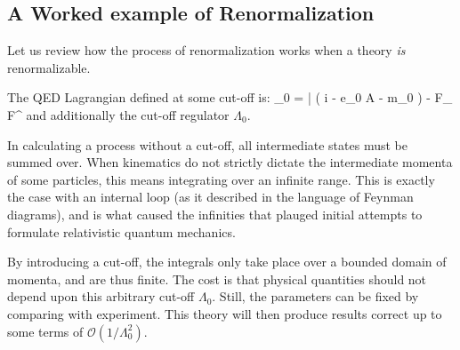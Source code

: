 


\subsection{A Worked example of Renormalization}
Let us review how the process of renormalization works when a theory {\it is} renormalizable.


The QED Lagrangian defined at some cut-off is:
\beq
	_0 = 
		\bar{\Psi} \left( i \partial \cdot \gamma - e_0 A \cdot \gamma - m_0 \right) \Psi -  F_{\mu\nu} F^{\mu\nu} 
\eeq 
and additionally the cut-off regulator $\Lambda_0$.  

In calculating a process without a cut-off, all intermediate states must be summed over.  When kinematics do not strictly dictate the intermediate momenta of some particles, this means integrating over an infinite range.  This is exactly the case with an internal loop (as it described in the language of Feynman diagrams), and is what caused the infinities that plauged initial attempts to formulate relativistic quantum mechanics. 

By introducing a cut-off, the integrals only take place over a bounded domain of momenta, and are thus finite.  The cost is that physical quantities should not depend upon this arbitrary cut-off $\Lambda_0$.  Still, the parameters can be fixed by comparing with experiment.  This theory will then produce results correct up to some terms of $\mathcal{O}(1/\Lambda_0^2)$.

